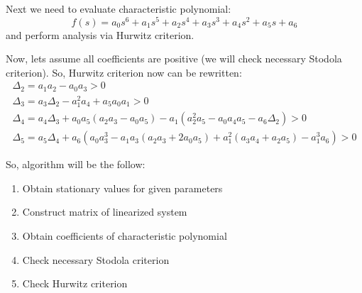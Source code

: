 \documentclass[12pt, notitlepage]{report}
\begin{document}
Next we need to evaluate characteristic polynomial:
\begin{equation}
	f(s) = a_0 s^6 + a_1 s^5 + a_2 s^4 + a_3 s^3 + a_4 s ^2 + a_5 s + a_6
\end{equation}
and perform analysis via Hurwitz criterion.

Now, lets assume all coefficients are positive (we will check necessary Stodola criterion). So, Hurwitz criterion now can be rewritten:
\begin{gather}
	\Delta_2 = a_1 a_2 - a_0 a_3 > 0 \\
	\Delta_3 = a_3\Delta_2 - a_1^2a_4 + a_5a_0a_1 > 0 \\
	\Delta_4 = a_4\Delta_3 + a_0a_5(a_2a_3-a_0a_5) -a_1(a_2^2a_5-a_0a_4a_5-a_6\Delta_2) > 0\\
	\Delta_5 = a_5\Delta_4 + a_6(a_0a_3^3-a_1a_3(a_2a_3+2a_0a_5)+a_1^2(a_3a_4+a_2a_5)-a_1^3a_6) > 0
\end{gather}

So, algorithm will be the follow:
\begin{enumerate}
	\item Obtain stationary values for given parameters
	\item Construct matrix of linearized system
	\item Obtain coefficients of characteristic polynomial
	\item Check necessary Stodola criterion
	\item Check Hurwitz criterion
\end{enumerate}
\end{document}
